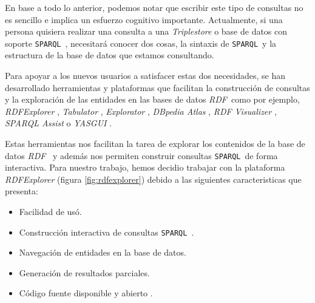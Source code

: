 \documentclass[conference,compsoc]{IEEEtran}
\newcommand{\rdf}{\textit{RDF}\ }
\newcommand{\spql}{\texttt{SPARQL}\ }
\begin{document}
\begin{table}[h]
    \label{tab:basic-result}
    \caption{Resultado de una consulta SPARQL básica}
    \centering
\end{table}

En base a todo lo anterior, podemos notar que escribir este tipo de consultas no es
sencillo e implica un esfuerzo cognitivo importante. Actualmente, si una persona
quisiera realizar una consulta a una \textit{Triplestore} o base de datos con soporte \spql, necesitará
conocer dos cosas, la sintaxis de \spql y la estructura de la base de datos que estamos
consultando.

Para apoyar a los nuevos usuarios a satisfacer estas dos necesidades, se han desarrollado
herramientas y plataformas que facilitan la construcción de consultas y la exploración
de las entidades en las bases de datos \rdf como por ejemplo, \textit{RDFExplorer}
\cite{vargas2019rdf}, \textit{Tabulator} \cite{berners2006tabulator} , \textit{Explorator}
\cite{araujo2009experimenting}, \textit{DBpedia Atlas} \cite{valsecchi2015dbpedia},
\textit{RDF Visualizer} \cite{sayers2004node}, \textit{SPARQL Assist}
\cite{mccarthy2012sparql} o \textit{YASGUI} \cite{rietveld2017yasgui}.

Estas herramientas nos facilitan la tarea de explorar los contenidos de la base de datos \rdf
y además nos permiten construir consultas \spql de forma interactiva. Para nuestro trabajo,
hemos decidio trabajar con la plataforma \textit{RDFExplorer} (figura \ref{fig:rdfexplorer}) debido a las siguientes
caracteristicas que presenta:

\begin{itemize}
    \item Facilidad de usó.
    \item Construcción interactiva de consultas \spql.
    \item Navegación de entidades en la base de datos.
    \item Generación de resultados parciales.
    \item Código fuente disponible y abierto \cite{vargas2019rdfrepo}.
\end{itemize}
\end{document}
